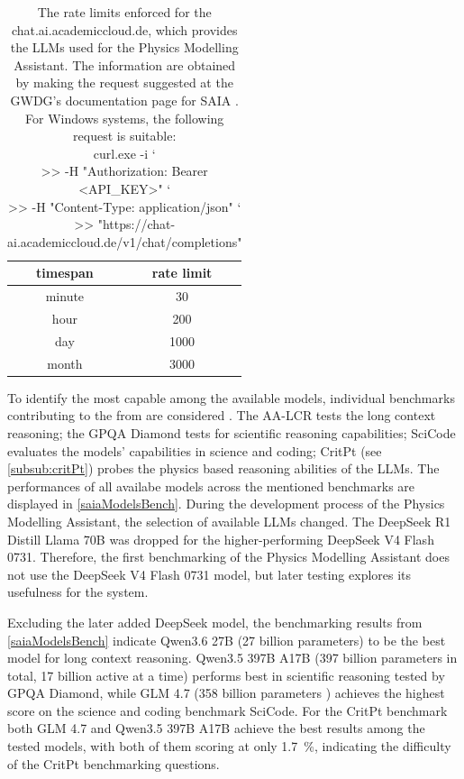 \documentclass[
	fontsize = 11pt,
	paper = a4,
	draft = false,
	twoside = true,
	titlepage = false
]{scrartcl}
\numberwithin{equation}{subsection}
\newcommand{\tabentry}[1]{%
	\addcontentsline{tab}{tabidx}{#1}%
}
\begin{document}
	\begin{table}[ht]
		\centering
		\caption{The rate limits enforced for the chat.ai.academiccloud.de, which provides the \gls{LLM}s used for the Physics Modelling Assistant. The information are obtained by making the request suggested at the GWDG's documentation page for SAIA \autocite[section: API Limits]{saiaModels}. For Windows systems, the following request is suitable:\\
		curl.exe -i `\\
		>>   -H "Authorization: Bearer <API\_KEY>" `\\
		>>   -H "Content-Type: application/json" `\\
		>>  "https://chat-ai.academiccloud.de/v1/chat/completions"}
		\label{tab:rateLimit}
		\tabentry{Rate Limits for the SAIA Models}
		\begin{tabular}{c 
						S[table-format=4, round-mode=places, round-precision=0, output-decimal-marker={.}]}
			\toprule[2pt]
			timespan & {rate limit}\\
			\midrule[1pt]
			minute & 30\\
			hour & 200\\
			day & 1000\\
			month & 3000\\
			\bottomrule[1pt]
		\end{tabular}
	\end{table}
	
	To identify the most capable among the available models, individual benchmarks contributing to the  from \citeauthor{artAnaLeaderboard} are considered \autocite{artAnaLeaderboard}. The AA-LCR \autocite{aaAA} tests the long context reasoning; the GPQA Diamond \autocite{aaDiamond} tests for scientific reasoning capabilities; SciCode \autocite{aaSciCode} evaluates the models' capabilities in science and coding; CritPt \autocite{aaCritPt} (see \autoref{subsub:critPt}) probes the physics based reasoning abilities of the \gls{LLM}s. The performances of all availabe models across the mentioned benchmarks are displayed in \autoref{saiaModelsBench}. During the development process of the Physics Modelling Assistant, the selection of available \gls{LLM}s changed. The DeepSeek R1 Distill Llama 70B was dropped for the higher-performing DeepSeek V4 Flash 0731. Therefore, the first benchmarking of the Physics Modelling Assistant does not use the DeepSeek V4 Flash 0731 model, but later testing explores its usefulness for the system.
	
	Excluding the later added DeepSeek model, the benchmarking results from \autoref{saiaModelsBench} indicate Qwen3.6 27B (27 billion parameters) to be the best model for long context reasoning. Qwen3.5 397B A17B (397 billion parameters in total, 17 billion active at a time) performs best in scientific reasoning tested by GPQA Diamond, while GLM 4.7 (358 billion parameters \autocite{glmParams}) achieves the highest score on the science and coding benchmark SciCode. For the CritPt benchmark both GLM 4.7 and Qwen3.5 397B A17B achieve the best results among the tested models, with both of them scoring at only \SI[round-mode=places, round-precision=1]{1.7}{\percent}, indicating the difficulty of the CritPt benchmarking questions.
	
\end{document}
